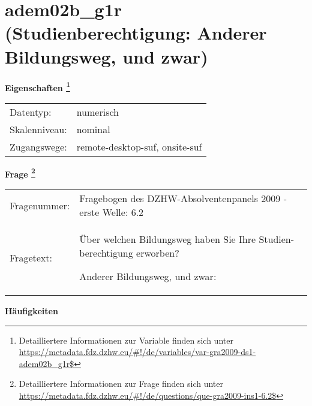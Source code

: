 
    \setcounter{footnote}{0}

    \vspace*{-1.8cm}
	\section{adem02b\_g1r (Studienberechtigung: Anderer Bildungsweg, und zwar)}
	\label{section:adem02b_g1r}



    \vspace*{0.5cm}
    \noindent\textbf{Eigenschaften
	\footnote{Detailliertere Informationen zur Variable finden sich unter
		\url{https://metadata.fdz.dzhw.eu/\#!/de/variables/var-gra2009-ds1-adem02b_g1r$}}}\\
	\begin{tabularx}{\hsize}{@{}lX}
	Datentyp: & numerisch \\
	Skalenniveau: & nominal \\
	Zugangswege: &
	  remote-desktop-suf, 
	  onsite-suf
 \\
    \end{tabularx}



				\vspace*{0.5cm}
                \noindent\textbf{Frage
	                \footnote{Detailliertere Informationen zur Frage finden sich unter
		              \url{https://metadata.fdz.dzhw.eu/\#!/de/questions/que-gra2009-ins1-6.2$}}}\\
				\begin{tabularx}{\hsize}{@{}lX}
					Fragenummer: &
					  Fragebogen des DZHW-Absolventenpanels 2009 - erste Welle:
					  6.2
 \\
					Fragetext: & Über welchen Bildungsweg haben Sie Ihre Studien- berechtigung erworben?\par  Anderer Bildungsweg, und zwar: \\
				\end{tabularx}





        		\vspace*{0.5cm}
                \noindent\textbf{Häufigkeiten}

